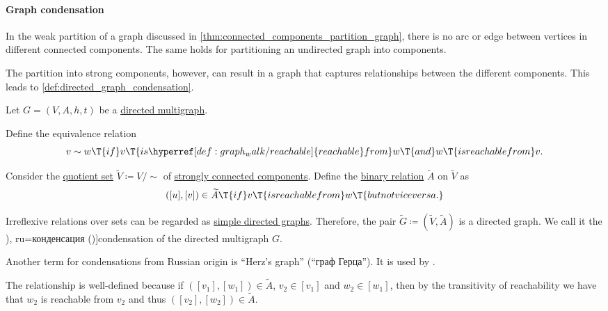 \paragraph{Graph condensation}

\begin{remark}\label{rem:graph_condensation}
  In the weak partition of a graph discussed in \cref{thm:connected_components_partition_graph}, there is no arc or edge between vertices in different connected components. The same holds for partitioning an undirected graph into components.

  The partition into strong components, however, can result in a graph that captures relationships between the different components. This leads to \cref{def:directed_graph_condensation}.
\end{remark}

\begin{definition}\label{def:directed_graph_condensation}
  Let \( G = (V, A, h, t) \) be a \hyperref[def:directed_multigraph]{directed multigraph}.

  Define the equivalence relation
  \begin{equation*}
    v \sim w \T{if} v \T{is \hyperref[def:graph_walk/reachable]{reachable} from} w \T{and} w \T{is reachable from} v.
  \end{equation*}

  Consider the \hyperref[def:equivalence_relation/quotient]{quotient set} \( \widetilde{V} \coloneqq V / {\sim} \) of \hyperref[def:graph_connected_component]{strongly connected components}. Define the \hyperref[def:binary_relation]{binary relation} \( \widetilde{A} \) on \( \widetilde{V} \) as
  \begin{equation*}
    ([u], [v]) \in \widetilde{A} \T{if} v \T{is reachable from} w \T{but not vice versa.}
  \end{equation*}

  Irreflexive relations over sets can be regarded as \hyperref[def:directed_graph]{simple directed graphs}. Therefore, the pair \( \widetilde{G} \coloneqq (\widetilde{V}, \widetilde{A}) \) is a directed graph. We call it the \term[bg=кондензация (\cite[61]{Мирчев2001Графи}), ru=конденсация (\cite[\S 8.5.2]{Новиков2013ДискретнаяМатематика})]{condensation} of the directed multigraph \( G \).
\end{definition}
\begin{comments}
  \item Another term for condensations from Russian origin is \enquote{Herz's graph} (\enquote{граф Герца}). It is used by \textcite[\S 8.5.2]{Новиков2013ДискретнаяМатематика}.
\end{comments}
\begin{defproof}
  The relationship is well-defined because if \( ([v_1], [w_1]) \in \widetilde{A} \), \( v_2 \in [v_1] \) and \( w_2 \in [w_1] \), then by the transitivity of reachability we have that \( w_2 \) is reachable from \( v_2 \) and thus \( ([v_2], [w_2]) \in \widetilde{A} \).
\end{defproof}

